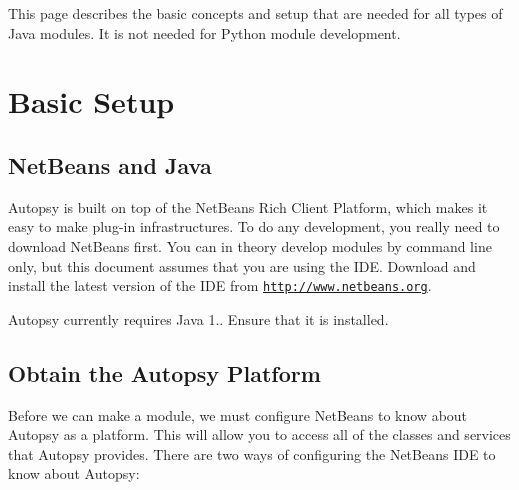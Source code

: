 This page describes the basic concepts and setup that are needed for all types of Java modules. It is not needed for Python module development.\hypertarget{mod_dev_page_mod_dev_setup}{}\section{Basic Setup}\label{mod_dev_page_mod_dev_setup}
\hypertarget{mod_dev_page_mod_dev_setup_nb}{}\subsection{Net\+Beans and Java}\label{mod_dev_page_mod_dev_setup_nb}
Autopsy is built on top of the Net\+Beans Rich Client Platform, which makes it easy to make plug-\/in infrastructures. To do any development, you really need to download Net\+Beans first. You can in theory develop modules by command line only, but this document assumes that you are using the I\+DE. Download and install the latest version of the I\+DE from \href{http://www.netbeans.org}{\tt http\+://www.\+netbeans.\+org}.

Autopsy currently requires Java 1.. Ensure that it is installed.\hypertarget{mod_dev_page_mod_dev_setup_platform}{}\subsection{Obtain the Autopsy Platform}\label{mod_dev_page_mod_dev_setup_platform}
Before we can make a module, we must configure Net\+Beans to know about Autopsy as a platform. This will allow you to access all of the classes and services that Autopsy provides. There are two ways of configuring the Net\+Beans I\+DE to know about Autopsy\+:


